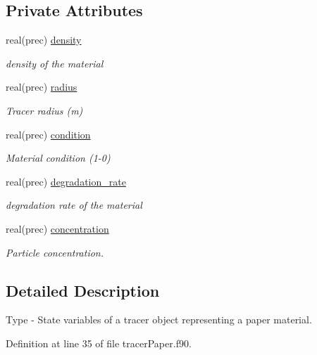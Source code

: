 \subsection*{Private Attributes}
\begin{DoxyCompactItemize}
\item 
real(prec) \mbox{\hyperlink{structtracerpaper__mod_1_1paper__state__class_a87732840a207f7c0227040cf56f40441}{density}}
\begin{DoxyCompactList}\small\item\em density of the material \end{DoxyCompactList}\item 
real(prec) \mbox{\hyperlink{structtracerpaper__mod_1_1paper__state__class_aca8ba08eafd11071094fd7749b6bf3c7}{radius}}
\begin{DoxyCompactList}\small\item\em Tracer radius (m) \end{DoxyCompactList}\item 
real(prec) \mbox{\hyperlink{structtracerpaper__mod_1_1paper__state__class_a8821f663963b1a995fb720b63093fea7}{condition}}
\begin{DoxyCompactList}\small\item\em Material condition (1-\/0) \end{DoxyCompactList}\item 
real(prec) \mbox{\hyperlink{structtracerpaper__mod_1_1paper__state__class_a96002387923c8aa4bc4653e808adca95}{degradation\+\_\+rate}}
\begin{DoxyCompactList}\small\item\em degradation rate of the material \end{DoxyCompactList}\item 
real(prec) \mbox{\hyperlink{structtracerpaper__mod_1_1paper__state__class_a7a1eeb300aeedc086104f5a2e07df586}{concentration}}
\begin{DoxyCompactList}\small\item\em Particle concentration. \end{DoxyCompactList}\end{DoxyCompactItemize}


\subsection{Detailed Description}
Type -\/ State variables of a tracer object representing a paper material. 

Definition at line 35 of file tracer\+Paper.\+f90.



